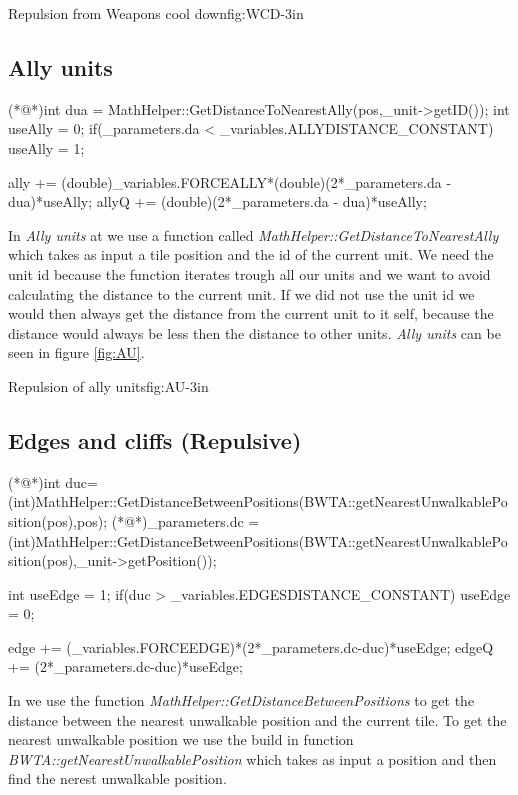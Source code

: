 		{Repulsion from Weapons cool down}{fig:WCD}{-3in}

	\subsection{Ally units}
		\begin{Sourcecode}[caption=Ally units]
(*@\lnote@*)int dua = MathHelper::GetDistanceToNearestAlly(pos,_unit->getID());
int useAlly = 0;
if(_parameters.da < _variables.ALLYDISTANCE_CONSTANT)
	useAlly = 1;

ally += (double)_variables.FORCEALLY*(double)(2*_parameters.da - dua)*useAlly;
allyQ += (double)(2*_parameters.da - dua)*useAlly;
\end{Sourcecode}	
	In \textit{Ally units} at  we use a function called \textit{MathHelper::GetDistanceToNearestAlly} which takes as input a tile position and the id of the current unit. We need the unit id because the function iterates trough all our units and we want to avoid calculating the distance to the current unit. If we did not use the unit id we would then always get the distance from the current unit to it self, because the distance would always be less then the distance to other units. \textit{Ally units} can be seen in figure \ref{fig:AU}.
	
			{Repulsion of ally units}{fig:AU}{-3in}

	\subsection{Edges and cliffs (Repulsive)}
	\begin{Sourcecode}[caption=Edges and cliffs]
(*@\lnote@*)int duc= (int)MathHelper::GetDistanceBetweenPositions(BWTA::getNearestUnwalkablePosition(pos),pos);
(*@\lnote@*)_parameters.dc = (int)MathHelper::GetDistanceBetweenPositions(BWTA::getNearestUnwalkablePosition(pos),_unit->getPosition());

int useEdge = 1;
if(duc > _variables.EDGESDISTANCE_CONSTANT)
	useEdge = 0;

edge += (_variables.FORCEEDGE)*(2*_parameters.dc-duc)*useEdge;
edgeQ += (2*_parameters.dc-duc)*useEdge;
\end{Sourcecode}	
    In  we use the function \textit{MathHelper::GetDistanceBetweenPositions} to get the distance between the nearest unwalkable position and the current tile. To get the nearest unwalkable position we use the build in function \textit{BWTA::getNearestUnwalkablePosition} which takes as input a position and then find the nerest unwalkable position.

